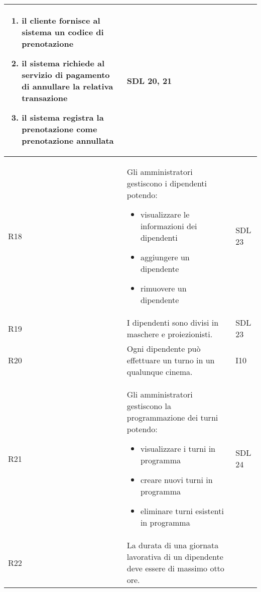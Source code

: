 \begin{longtable}{|p{0.8cm}|p{13.4cm}|p{2.1cm}|}
      \begin{enumerate}
            \item il cliente fornisce al sistema un codice di
                  prenotazione
            \item il sistema richiede al servizio di pagamento di
                  annullare la relativa transazione
            \item il sistema registra la prenotazione come prenotazione
                  annullata
      \end{enumerate}             &
      SDL 20, 21
      \\\hline
      R18                                                                     &
      Gli amministratori gestiscono i dipendenti potendo:
      \begin{itemize}
            \item visualizzare le informazioni dei dipendenti
            \item aggiungere un dipendente
            \item rimuovere un dipendente
      \end{itemize}                       &
      SDL 23
      \\\hline
      R19                                                                     &
      I dipendenti sono divisi in maschere e proiezionisti.                   &
      SDL 23
      \\\hline
      R20                                                                     &
      Ogni dipendente può effettuare un turno in un qualunque cinema.         &
      I10
      \\\hline
      R21                                                                     &
      Gli amministratori gestiscono la programmazione dei turni
      potendo:
      \begin{itemize}
            \item visualizzare i turni in programma
            \item creare nuovi turni in programma
            \item eliminare turni esistenti in programma
      \end{itemize}                            &
      SDL 24
      \\\hline
      R22                                                                     &
      La durata di una giornata lavorativa di un dipendente deve essere di
      massimo otto ore.                                                       &

\end{longtable}
